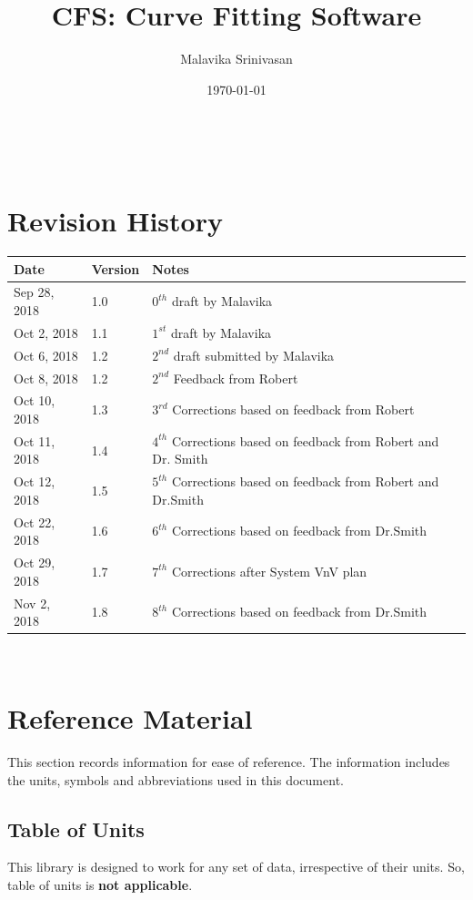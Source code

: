 \documentclass[12pt]{article}
\begin{document}
\title{CFS: Curve Fitting Software} 
\author{Malavika Srinivasan}
\date{\today}

\maketitle

~\newpage


\section{Revision History}

\begin{tabularx}{\textwidth}{p{3cm}p{2cm}X}
\toprule {\bf Date} & {\bf Version} & {\bf Notes}\\
\midrule
Sep 28, 2018 & 1.0 & $0^{th}$ draft by Malavika\\
Oct 2, 2018 & 1.1 & $1^{st}$ draft by Malavika\\
Oct 6, 2018 & 1.2 & $2^{nd}$ draft submitted by Malavika\\
Oct 8, 2018 & 1.2 & $2^{nd}$ Feedback from Robert\\
Oct 10, 2018 & 1.3 & $3^{rd}$ Corrections based on feedback from Robert\\
Oct 11, 2018 & 1.4 & $4^{th}$ Corrections based on feedback from Robert and Dr. Smith\\
Oct 12, 2018 & 1.5 & $5^{th}$ Corrections based on feedback from Robert and Dr.Smith\\
Oct 22, 2018 & 1.6 & $6^{th}$ Corrections based on feedback from Dr.Smith\\
Oct 29, 2018 & 1.7 & $7^{th}$ Corrections after System VnV plan\\
Nov 2, 2018 & 1.8 & $8^{th}$ Corrections based on feedback from Dr.Smith\\
\bottomrule
\end{tabularx}

~\newpage
	
\section{Reference Material}

This section records information for ease of reference. The information includes the units, symbols and abbreviations used in this document.

\subsection{Table of Units}
This library is designed to work for any set of data, irrespective of their units. So, table of units is \textbf{not applicable}. 
\end{document}
